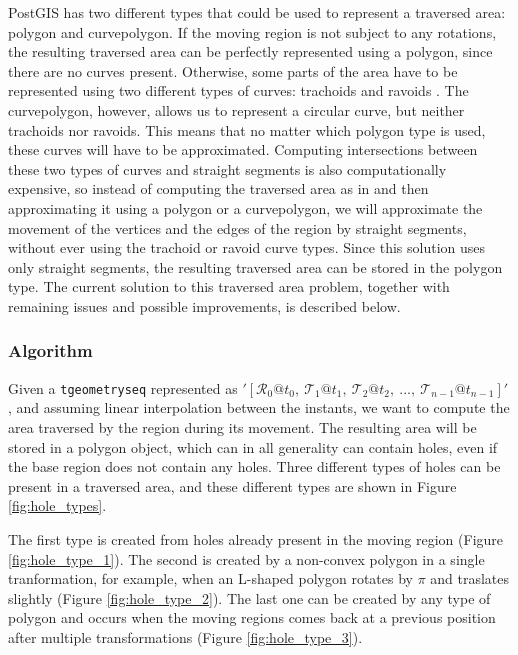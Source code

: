 PostGIS has two different types that could be used to represent a traversed area: polygon and curvepolygon. If the moving region is not subject to any rotations, the resulting traversed area can be perfectly represented using a polygon, since there are no curves present. Otherwise, some parts of the area have to be represented using two different types of curves: trachoids and ravoids \cite{fmregion}. The curvepolygon, however, allows us to represent a circular curve, but neither trachoids nor ravoids. This means that no matter which polygon type is used, these curves will have to be approximated. Computing intersections between these two types of curves and straight segments is also computationally expensive, so instead of computing the traversed area as in \cite{fmregion} and then approximating it using a polygon or a curvepolygon, we will approximate the movement of the vertices and the edges of the region by straight segments, without ever using the trachoid or ravoid curve types. Since this solution uses only straight segments, the resulting traversed area can be stored in the polygon type. The current solution to this traversed area problem, together with remaining issues and possible improvements, is described below.

\subsubsection{Algorithm}

Given a \lstinline+tgeometryseq+ represented as $'[\mathcal{R}_0@t_0,\ \mathcal{T}_1@t_1,\ \mathcal{T}_2@t_2,\ ..., \ \mathcal{T}_{n-1}@t_{n-1}]'$, and assuming linear interpolation between the instants, we want to compute the area traversed by the region during its movement. The resulting area will be stored in a polygon object, which can in all generality can contain holes, even if the base region does not contain any holes. Three different types of holes can be present in a traversed area, and these different types are shown in Figure \ref{fig:hole_types}. 

The first type is created from holes already present in the moving region (Figure \ref{fig:hole_type_1}). The second is created by a non-convex polygon in a single tranformation, for example, when an L-shaped polygon rotates by $\pi$ and traslates slightly (Figure \ref{fig:hole_type_2}). The last one can be created by any type of polygon and occurs when the moving regions comes back at a previous position after multiple transformations (Figure \ref{fig:hole_type_3}).

